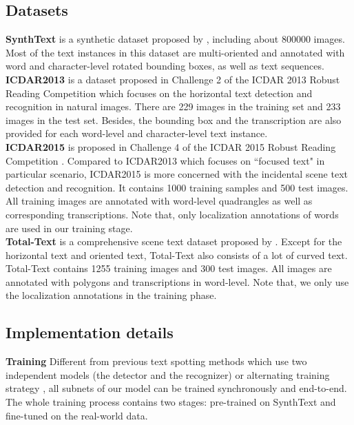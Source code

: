\documentclass[runningheads]{llncs}
\begin{document}
\subsection{Datasets}
\textbf{SynthText} is a synthetic dataset proposed by \cite{SynthText}, including about 800000 images. Most of the text instances in this dataset are multi-oriented and annotated  with word and character-level rotated bounding boxes, as well as text sequences.
\\
\textbf{ICDAR2013} is a dataset proposed in Challenge 2 of the ICDAR 2013 Robust Reading Competition \cite{karatzas2013icdar} which focuses on the horizontal text detection and recognition in natural images. There are 229 images in the training set and 233 images in the test set. Besides, the bounding box and the transcription are also provided for each word-level and character-level text instance. 
\\
\textbf{ICDAR2015} is proposed in Challenge 4 of the ICDAR 2015 Robust Reading Competition \cite{karatzas2015icdar}. Compared to ICDAR2013 which focuses on ``focused text" in particular scenario, ICDAR2015 is more concerned with the incidental scene text detection and recognition. It contains 1000 training samples and 500 test images. All training images are annotated with word-level quadrangles as well as corresponding transcriptions. Note that, only localization annotations of words are used in our training stage.
\\
\textbf{Total-Text} is a comprehensive scene text dataset proposed by \cite{CK2017}. Except for the horizontal text and oriented text, Total-Text also consists of a lot of curved text. Total-Text contains 1255 training images and 300 test images. All images are annotated with polygons and transcriptions in word-level. Note that, we only use the localization annotations in the training phase.


\subsection{Implementation details}
\noindent\textbf{Training} Different from previous text spotting methods which use two independent models \cite{jaderberg2014deep,liao2017textboxes} (the detector and the recognizer) or alternating training strategy \cite{Li_2017_ICCV}, all subnets of our model can be trained synchronously and end-to-end. The whole training process contains two stages: pre-trained on SynthText and fine-tuned on the real-world data. 
\end{document}
